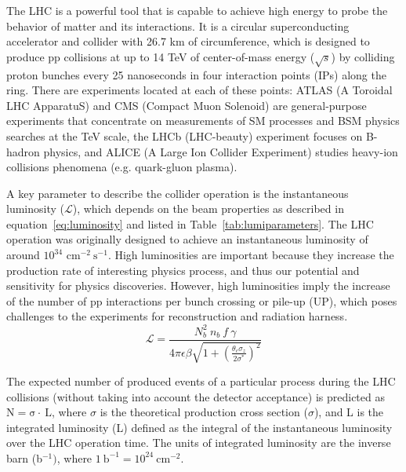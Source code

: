 The LHC is a powerful tool that is capable to achieve high energy to probe the behavior of matter and its interactions. It is a circular superconducting accelerator and collider with 26.7 km of circumference, which is designed to produce pp collisions at up to 14 TeV of center-of-mass energy ($\sqrt{s}$) by colliding proton bunches every 25 nanoseconds in four interaction points (IPs) along the ring. There are experiments located at each of these points: ATLAS (A Toroidal LHC ApparatuS) and CMS (Compact Muon Solenoid) are general-purpose experiments that concentrate on measurements of SM processes and BSM physics searches at the TeV scale, the LHCb (LHC-beauty) experiment focuses on B-hadron physics, and ALICE (A Large Ion Collider Experiment) studies heavy-ion collisions phenomena (e.g. quark-gluon plasma). 

A key parameter to describe the collider operation is the instantaneous luminosity ($\mathcal{L}$), which depends on the beam properties as described in equation~\ref{eq:luminosity} and listed in Table~\ref{tab:lumiparameters}. The LHC operation was originally designed to achieve an instantaneous luminosity of around $\mathrm{10^{34}}$ $\mathrm{cm^{-2}~s^{-1}}$. High luminosities are important because they increase the production rate of interesting physics process, and thus our potential and sensitivity for physics discoveries. However, high luminosities imply the increase of the number of pp interactions per bunch crossing or pile-up (UP), which poses challenges to the experiments for reconstruction and radiation harness.
\begin{equation}
\label{eq:luminosity}
\mathcal{L}=\frac{ N_{b}^{2}~n_{b}~f~\gamma}{4\pi\epsilon\beta\sqrt{1 + (\frac{\theta_{c} \sigma_{z}} {2\sigma^{*}} )^{2} } }    
\end{equation}

The expected number of produced events of a particular process during the LHC collisions (without taking into account the detector acceptance) is predicted as $\mathrm{N=\sigma\cdot~L}$, where $\sigma$ is the theoretical production cross section ($\sigma$), and L is the integrated luminosity (L) defined as the integral of the instantaneous luminosity over the LHC operation time. The units of integrated luminosity are the inverse barn (b$^{-1})$, where $\mathrm{1~b^{-1} = 10^{24}~cm^{-2}}$.

